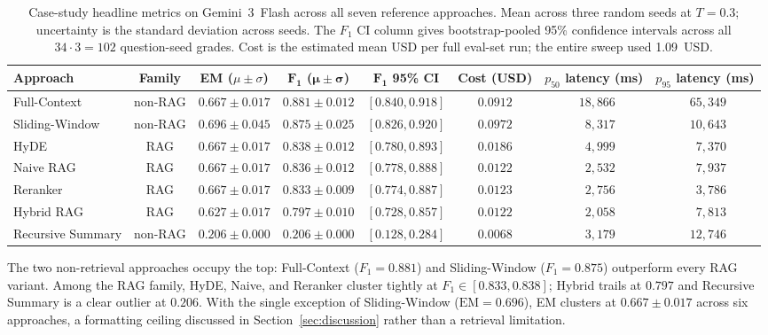 \documentclass[conference,a4paper,10pt]{IEEEtran}
\begin{document}
\begin{table}[!t]
\centering
\caption{Case-study headline metrics on Gemini~3~Flash across all seven reference approaches. Mean across three random seeds at $T = 0.3$; uncertainty is the standard deviation across seeds. The $F_1$ CI column gives bootstrap-pooled 95\% confidence intervals across all $34 \cdot 3 = 102$ question-seed grades. Cost is the estimated mean USD per full eval-set run; the entire sweep used 1.09~USD.}
\label{tab:headline}
\renewcommand{\arraystretch}{1.15}
\begin{tabular}{l c c c c c c c}
\toprule
\textbf{Approach} & \textbf{Family} & \textbf{EM} ($\mu \pm \sigma$) & $\boldsymbol{F_1}$ ($\boldsymbol{\mu \pm \sigma}$) & $\boldsymbol{F_1}$ \textbf{95\% CI} & \textbf{Cost (USD)} & \textbf{$p_{50}$ latency (ms)} & \textbf{$p_{95}$ latency (ms)}\\
\midrule
Full-Context        & non-RAG & $0.667 \pm 0.017$ & $\mathbf{0.881 \pm 0.012}$ & $[0.840, 0.918]$ & $0.0912$ & $\phantom{0}18{,}866$ & $\phantom{0}65{,}349$\\
Sliding-Window      & non-RAG & $\mathbf{0.696 \pm 0.045}$ & $0.875 \pm 0.025$ & $[0.826, 0.920]$ & $0.0972$ & $\phantom{00}8{,}317$ & $\phantom{0}10{,}643$\\
HyDE                & RAG     & $0.667 \pm 0.017$ & $0.838 \pm 0.012$ & $[0.780, 0.893]$ & $0.0186$ & $\phantom{00}4{,}999$ & $\phantom{00}7{,}370$\\
Naive RAG           & RAG     & $0.667 \pm 0.017$ & $0.836 \pm 0.012$ & $[0.778, 0.888]$ & $0.0122$ & $\phantom{00}2{,}532$ & $\phantom{00}7{,}937$\\
Reranker            & RAG     & $0.667 \pm 0.017$ & $0.833 \pm 0.009$ & $[0.774, 0.887]$ & $0.0123$ & $\phantom{00}2{,}756$ & $\phantom{00}3{,}786$\\
Hybrid RAG          & RAG     & $0.627 \pm 0.017$ & $0.797 \pm 0.010$ & $[0.728, 0.857]$ & $0.0122$ & $\phantom{00}2{,}058$ & $\phantom{00}7{,}813$\\
Recursive Summary   & non-RAG & $0.206 \pm 0.000$ & $0.206 \pm 0.000$ & $[0.128, 0.284]$ & $0.0068$ & $\phantom{00}3{,}179$ & $\phantom{0}12{,}746$\\
\bottomrule
\end{tabular}
\end{table}

The two non-retrieval approaches occupy the top: Full-Context ($F_1 = 0.881$) and Sliding-Window ($F_1 = 0.875$) outperform every RAG variant.
Among the RAG family, HyDE, Naive, and Reranker cluster tightly at $F_1 \in [0.833, 0.838]$; Hybrid trails at $0.797$ and Recursive Summary is a clear outlier at $0.206$.
With the single exception of Sliding-Window ($\mathrm{EM}=0.696$), EM clusters at $0.667 \pm 0.017$ across six approaches, a formatting ceiling discussed in Section~\ref{sec:discussion} rather than a retrieval limitation.
\end{document}
